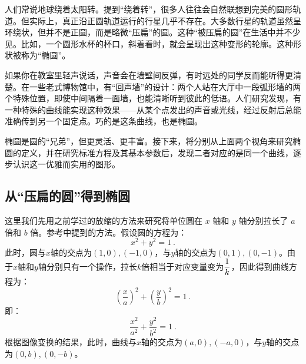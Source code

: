 
\begin{issues}
\issueDraft
\end{issues}



人们常说地球绕着太阳转。提到“绕着转”，很多人往往会自然联想到完美的圆形轨道。但实际上，真正沿正圆轨道运行的行星几乎不存在。大多数行星的轨道虽然呈环绕状，但并不是正圆，而是略微“压扁”的圆。这种“被压扁的圆”在生活中并不少见。比如，一个圆形水杯的杯口，斜着看时，就会呈现出这种变形的轮廓。这种形状被称为“椭圆”。

如果你在教室里轻声说话，声音会在墙壁间反弹，有时远处的同学反而能听得更清楚。在一些老式博物馆中，有“回声墙”的设计：两个人站在大厅中一段弧形墙的两个特殊位置，即使中间隔着一面墙，也能清晰听到彼此的低语。人们研究发现，有一种特殊的曲线能实现这种效果——从某个点发出的声音或光线，经过反射后总能准确传到另一个固定点。巧的是这条曲线，也是椭圆。

椭圆是圆的“兄弟”，但更灵活、更丰富。接下来，将分别从上面两个视角来研究椭圆的定义，并在研究标准方程及其基本参数后，发现二者对应的是同一个曲线，逐步认识这一优雅而实用的图形。

\subsection{从“压扁的圆”得到椭圆}

这里我们先用之前学过的放缩的方法来研究将单位圆在 $x$ 轴和 $y$ 轴分别拉长了 $a$ 倍和 $b$ 倍。参考中提到的方法。假设圆的方程为：
\begin{equation}
x^2 + y^2 = 1~.
\end{equation}
此时，圆与$x$轴的交点为$(1,0),(-1,0)$，与$y$轴的交点为$(0,1),(0,-1)$。由于$x$轴和$y$轴分别只有一个操作，拉长$k$倍相当于对应变量变为$\displaystyle{1\over k}$，因此得到曲线方程为：
\begin{equation}
\left(\frac{x}{a}\right)^2 + \left(\frac{y}{b}\right)^2 = 1~.
\end{equation}
即：
\begin{equation}
\frac{x^2}{a^2} + \frac{y^2}{b^2} = 1~.
\end{equation}
根据图像变换的结果，此时，曲线与$x$轴的交点为$(a,0),(-a,0)$，与$y$轴的交点为$(0,b),(0,-b)$。

